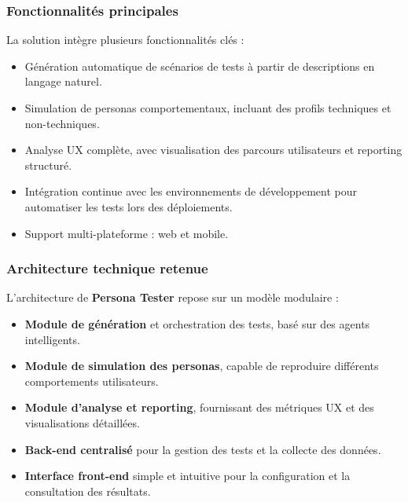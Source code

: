 \subsubsection{Fonctionnalités principales}
La solution intègre plusieurs fonctionnalités clés :
\begin{itemize}
    \item Génération automatique de scénarios de tests à partir de descriptions en langage naturel.
    \item Simulation de personas comportementaux, incluant des profils techniques et non-techniques.
    \item Analyse UX complète, avec visualisation des parcours utilisateurs et reporting structuré.
    \item Intégration continue avec les environnements de développement pour automatiser les tests lors des déploiements.
    \item Support multi-plateforme : web et mobile.
\end{itemize}

\subsubsection{Architecture technique retenue}
L’architecture de \textbf{Persona Tester} repose sur un modèle modulaire :
\begin{itemize}
    \item \textbf{Module de génération} et orchestration des tests, basé sur des agents intelligents.\\
    \item\textbf{ Module de simulation des personas}, capable de reproduire différents comportements utilisateurs.\\
    \item\textbf{ Module d’analyse et reporting}, fournissant des métriques UX et des visualisations détaillées.\\
    \item \textbf{Back-end centralisé }pour la gestion des tests et la collecte des données.\\
    \item\textbf{ Interface front-end} simple et intuitive pour la configuration et la consultation des résultats.
\end{itemize}

